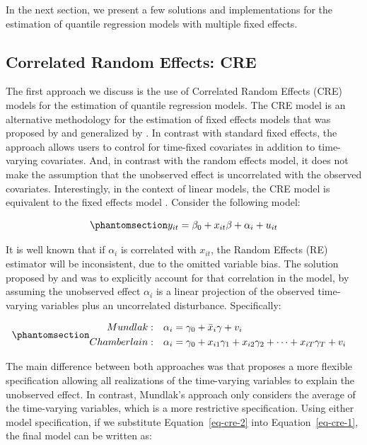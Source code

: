\documentclass[bib]{statapress}
\begin{document}
In the next section, we present a few solutions and implementations for
the estimation of quantile regression models with multiple fixed
effects.

\subsection{Correlated Random Effects: CRE}\label{sec-cre}

The first approach we discuss is the use of Correlated Random Effects
(CRE) models for the estimation of quantile regression models. The CRE
model is an alternative methodology for the estimation of fixed effects
models that was proposed by \citet{mundlak1978} and generalized by
\citet{chamberlain1982}. In contrast with standard fixed effects, the
approach allows users to control for time-fixed covariates in addition
to time-varying covariates. And, in contrast with the random effects
model, it does not make the assumption that the unobserved effect is
uncorrelated with the observed covariates. Interestingly, in the context
of linear models, the CRE model is equivalent to the fixed effects model
\citep{wooldridge2010}. Consider the following model:

\begin{equation}\phantomsection\label{eq-cre-1}{y_{it} = \beta_0 + x_{it}\beta  + \alpha_i + u_{it}
}\end{equation}

It is well known that if \(\alpha_i\) is correlated with \(x_{it}\), the
Random Effects (RE) estimator will be inconsistent, due to the omitted
variable bias. The solution proposed by \citet{mundlak1978} and
\citet{chamberlain1982} was to explicitly account for that correlation
in the model, by assuming the unobserved effect \(\alpha_i\) is a linear
projection of the observed time-varying variables plus an uncorrelated
disturbance. Specifically:

\begin{equation}\phantomsection\label{eq-cre-2}{\begin{aligned}
Mundlak:  & & \alpha_i &= \gamma_0 + \bar x_{i}\gamma + v_i&  \\
Chamberlain: & & \alpha_i &= \gamma_0 + x_{i1}\gamma_1 + x_{i2}\gamma_2 + \dots + x_{iT}\gamma_T + v_i 
\end{aligned}
}\end{equation}

The main difference between both approaches was that
\citet{chamberlain1982} proposes a more flexible specification allowing
all realizations of the time-varying variables to explain the unobserved
effect. In contrast, Mundlak's approach only considers the average of
the time-varying variables, which is a more restrictive specification.
Using either model specification, if we substitute
Equation~\ref{eq-cre-2} into Equation~\ref{eq-cre-1}, the final model
can be written as:
\end{document}
